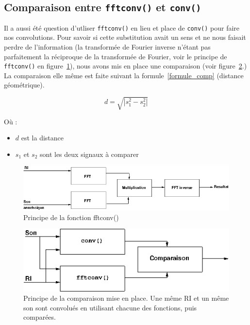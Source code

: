 \documentclass[12pt]{article}
\begin{document}
\subsection{Comparaison entre \texttt{fftconv()} et \texttt{conv()}} %

Il a aussi été question d'utliser \texttt{fftconv()} en lieu et place de \texttt{conv()} pour faire nos convolutions.
Pour savoir si cette substitution avait un sens et ne nous faisait perdre de l'information (la transformée de Fourier
inverse n'étant pas parfaitement la réciproque de la transformée de Fourier, voir le principe de \texttt{fftconv()} en
figure~\ref{principe_fftconv}), nous avons mis en place une comparaison (voir figure~\ref{principe_comparaison}.) La
comparaison elle même est faite suivant la formule~\ref{formule_comp} (distance géométrique).

\begin{equation}
\label{formule_comp}
d = \sqrt{|s_1^2 - s_2^2|}
\end{equation}

Où :
\begin{itemize}
    \item $d$ est la distance
    \item $s_1$ et $s_2$ sont les deux signaux à comparer
\end{itemize}

\begin{figure}[h!]
\begin{center}
\includegraphics[width=15cm]{fftconv}
\caption{\label{principe_fftconv}Principe de la fonction fftconv()}
\end{center}
\end{figure}
\begin{figure}[h!]
\begin{center}
\includegraphics[width=15cm]{comparaison_principe}
\caption{\label{principe_comparaison}Principe de la comparaison mise en place. Une même RI et un même son sont convolués
en utilisant chacune des fonctions, puis comparées.}
\end{center}
\end{figure}
\end{document}
